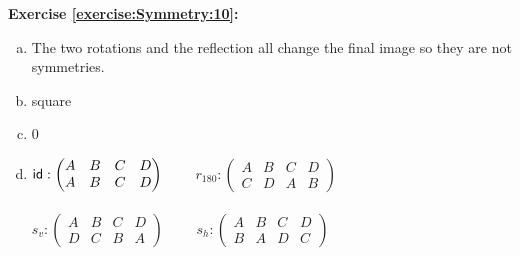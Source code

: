 \noindent\textbf{Exercise \ref{exercise:Symmetry:10}:}
\begin{enumerate}[(a)]
\item
The two rotations and the reflection all change the final image so they are not symmetries.

\item
square

\item
0

\item
$\sf{id}: \begin{pmatrix}
A & B & C & D\\
A & B & C & D
\end{pmatrix}$
$\qquad r_{180}: \begin{pmatrix}
A & B & C & D\\
C & D & A & B
\end{pmatrix}$\\
\\
$s_{v}: \begin{pmatrix}
A & B & C & D\\
D & C & B & A
\end{pmatrix}$
$\qquad s_{h}: \begin{pmatrix}
A & B & C & D\\
B & A & D & C
\end{pmatrix}$
\end{enumerate}

